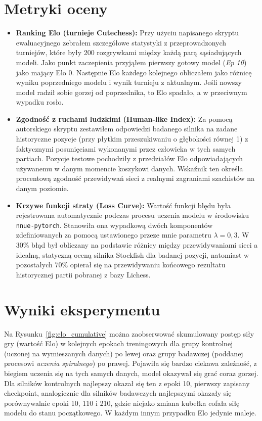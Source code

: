 \documentclass[12pt,a4paper]{report}
\begin{document}
\section{Metryki oceny}

\begin{itemize}
    \item \textbf{Ranking Elo (turnieje Cutechess):} Przy użyciu napisanego skryptu ewaluacyjnego zebrałem szczegółowe statystyki z przeprowadzonych turniejów, które były 200 rozgrywkami między każdą parą sąsiadujących modeli. Jako punkt zaczepienia przyjąłem pierwszy gotowy model (\textit{Ep 10}) jako mający Elo 0. Następnie Elo każdego kolejnego obliczałem jako różnicę wyniku poprzedniego modelu i wynik turnieju z aktualnym. Jeśli nowszy model radził sobie gorzej od poprzednika, to Elo spadało, a w przeciwnym wypadku rosło.
    \item \textbf{Zgodność z ruchami ludzkimi (Human-like Index):} Za pomocą autorskiego skryptu zestawiłem odpowiedzi badanego silnika na zadane historyczne pozycje (przy płytkim przeszukiwaniu o głębokości równej 1) z faktycznymi posunięciami wykonanymi przez człowieka w tych samych partiach. Pozycje testowe pochodziły z przedziałów Elo odpowiadających używanemu w danym momencie koszykowi danych. Wskaźnik ten określa procentową zgodność przewidywań sieci z realnymi zagraniami szachistów na danym poziomie.
    \item \textbf{Krzywe funkcji straty (Loss Curve):} Wartość funkcji błędu była rejestrowana automatycznie podczas procesu uczenia modelu w środowisku \texttt{nnue-pytorch}. Stanowiła ona wypadkową dwóch komponentów zdefiniowanych za pomocą ustawionego przeze mnie parametru $\lambda = 0{,}3$. W 30\% błąd był obliczany na podstawie różnicy między przewidywaniami sieci a idealną, statyczną oceną silnika Stockfish dla badanej pozycji, natomiast w pozostałych 70\% opierał się na przewidywaniu końcowego rezultatu historycznej partii pobranej z bazy Lichess.
\end{itemize}

\section{Wyniki eksperymentu}

Na Rysunku~\ref{fig:elo_cumulative} można zaobserwować skumulowany postęp siły gry (wartość Elo) w kolejnych epokach treningowych dla grupy kontrolnej (uczonej na wymieszanych danych) po lewej oraz grupy badawczej (poddanej procesowi \textit{uczenia spiralnego}) po prawej. Pojawiła się bardzo ciekawa zależność, z biegiem uczenia się na tych samych danych, model okazywał się grać coraz gorzej. Dla silników kontrolnych najlepszy okazał się ten z epoki 10, pierwszy zapisany checkpoint, analogicznie dla silników badawczych najlepszymi okazały się porównywalnie epoki 10, 110 i 210, gdzie niejako zmiana kubełka cofała siłę modelu do stanu początkowego. W każdym innym przypadku Elo jedynie maleje.
\end{document}
